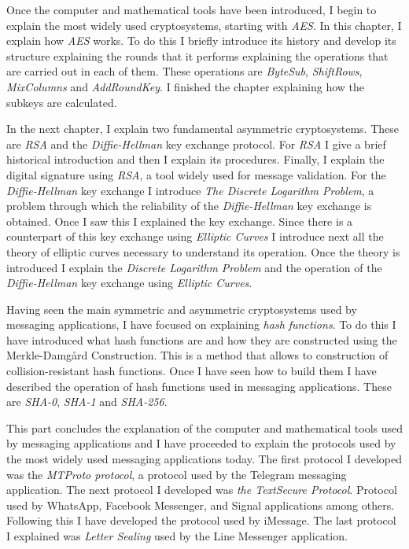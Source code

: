 Once the computer and mathematical tools have been introduced, I begin to explain the most widely used cryptosystems, starting with \emph{AES}.
In this chapter, I explain how \emph{AES} works. To do this I briefly introduce its history and develop its structure explaining the rounds that it performs explaining the operations that are carried out in each of them. These operations are \emph{ByteSub}, \emph{ShiftRows}, \emph{MixColumns} and \emph{AddRoundKey}. I finished the chapter explaining how the subkeys are calculated.

In the next chapter, I explain two fundamental asymmetric cryptosystems. These are \emph{RSA} and the \emph{Diffie-Hellman} key exchange protocol.
For \emph{RSA} I give a brief historical introduction and then I explain its procedures. Finally, I explain the digital signature using \emph{RSA}, a tool widely used for message validation.
For the \emph{Diffie-Hellman} key exchange I introduce \emph{The Discrete Logarithm Problem}, a problem through which the reliability of the \emph{Diffie-Hellman} key exchange is obtained. Once I saw this I explained the key exchange. Since there is a counterpart of this key exchange using \emph{Elliptic Curves} I introduce next all the theory of elliptic curves necessary to understand its operation. Once the theory is introduced I explain the \emph{Discrete Logarithm Problem} and the operation of the \emph{Diffie-Hellman} key exchange using \emph{Elliptic Curves}.

Having seen the main symmetric and asymmetric cryptosystems used by messaging applications, I have focused on explaining \emph{hash functions}.
To do this I have introduced what hash functions are and how they are constructed using the Merkle-Damgård Construction. This is a method that allows to construction of collision-resistant hash functions. Once I have seen how to build them I have described the operation of hash functions used in messaging applications. These are \emph{SHA-0}, \emph{SHA-1} and \emph{SHA-256}.

This part concludes the explanation of the computer and mathematical tools used by messaging applications and I have proceeded to explain the protocols used by the most widely used messaging applications today. 
The first protocol I developed was the \emph{MTProto protocol}, a protocol used by the Telegram messaging application. 
The next protocol I developed was \emph{the TextSecure Protocol}. Protocol used by WhatsApp, Facebook Messenger, and Signal applications among others.
Following this I have developed the protocol used by iMessage.
The last protocol I explained was \emph{Letter Sealing} used by the Line Messenger application.

